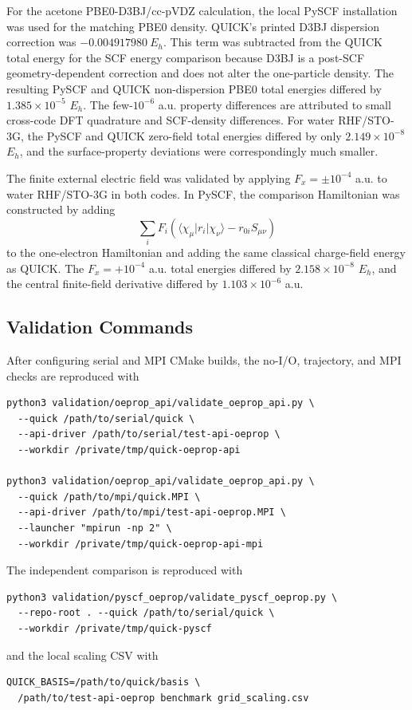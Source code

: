 \documentclass[journal=jcisd8,manuscript=suppinfo]{achemso}
\begin{document}
For the acetone PBE0-D3BJ/cc-pVDZ calculation, the local PySCF installation was used for the matching PBE0 density.  QUICK's printed D3BJ dispersion correction was \(-0.004917980~E_h\).  This term was subtracted from the QUICK total energy for the SCF energy comparison because D3BJ is a post-SCF geometry-dependent correction and does not alter the one-particle density.  The resulting PySCF and QUICK non-dispersion PBE0 total energies differed by \(1.385\times10^{-5}\) \(E_h\).  The few-\(10^{-6}\) a.u. property differences are attributed to small cross-code DFT quadrature and SCF-density differences.  For water RHF/STO-3G, the PySCF and QUICK zero-field total energies differed by only \(2.149\times10^{-8}\) \(E_h\), and the surface-property deviations were correspondingly much smaller.

The finite external electric field was validated by applying \(F_x=\pm10^{-4}\) a.u. to water RHF/STO-3G in both codes.  In PySCF, the comparison Hamiltonian was constructed by adding
\begin{equation}
  \sum_i F_i\left(\langle \chi_\mu|r_i|\chi_\nu\rangle-r_{0i}S_{\mu\nu}\right)
\end{equation}
to the one-electron Hamiltonian and adding the same classical charge-field energy as QUICK.  The \(F_x=+10^{-4}\) a.u. total energies differed by \(2.158\times10^{-8}\) \(E_h\), and the central finite-field derivative differed by \(1.103\times10^{-6}\) a.u.

\subsection{Validation Commands}

After configuring serial and MPI CMake builds, the no-I/O, trajectory, and MPI checks are reproduced with
\begin{verbatim}
python3 validation/oeprop_api/validate_oeprop_api.py \
  --quick /path/to/serial/quick \
  --api-driver /path/to/serial/test-api-oeprop \
  --workdir /private/tmp/quick-oeprop-api

python3 validation/oeprop_api/validate_oeprop_api.py \
  --quick /path/to/mpi/quick.MPI \
  --api-driver /path/to/mpi/test-api-oeprop.MPI \
  --launcher "mpirun -np 2" \
  --workdir /private/tmp/quick-oeprop-api-mpi
\end{verbatim}
The independent comparison is reproduced with
\begin{verbatim}
python3 validation/pyscf_oeprop/validate_pyscf_oeprop.py \
  --repo-root . --quick /path/to/serial/quick \
  --workdir /private/tmp/quick-pyscf
\end{verbatim}
and the local scaling CSV with
\begin{verbatim}
QUICK_BASIS=/path/to/quick/basis \
  /path/to/test-api-oeprop benchmark grid_scaling.csv
\end{verbatim}
\end{document}
